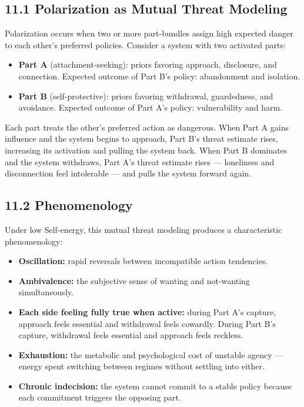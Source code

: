 \documentclass[11pt]{article}
\providecommand{\tightlist}{%
  \setlength{\itemsep}{0pt}\setlength{\parskip}{0pt}}
\begin{document}
\subsection{11.1 Polarization as Mutual Threat
Modeling}\label{polarization-as-mutual-threat-modeling}

Polarization occurs when two or more part-bundles assign high expected
danger to each other's preferred policies. Consider a system with two
activated parts:

\begin{itemize}
\tightlist
\item
  \textbf{Part A} (attachment-seeking): priors favoring approach,
  disclosure, and connection. Expected outcome of Part B's policy:
  abandonment and isolation.
\item
  \textbf{Part B} (self-protective): priors favoring withdrawal,
  guardedness, and avoidance. Expected outcome of Part A's policy:
  vulnerability and harm.
\end{itemize}

Each part treats the other's preferred action as dangerous. When Part A
gains influence and the system begins to approach, Part B's threat
estimate rises, increasing its activation and pulling the system back.
When Part B dominates and the system withdraws, Part A's threat estimate
rises --- loneliness and disconnection feel intolerable --- and pulls
the system forward again.

\subsection{11.2 Phenomenology}\label{phenomenology}

Under low Self-energy, this mutual threat modeling produces a
characteristic phenomenology:

\begin{itemize}
\tightlist
\item
  \textbf{Oscillation:} rapid reversals between incompatible action
  tendencies.
\item
  \textbf{Ambivalence:} the subjective sense of wanting and not-wanting
  simultaneously.
\item
  \textbf{Each side feeling fully true when active:} during Part A's
  capture, approach feels essential and withdrawal feels cowardly.
  During Part B's capture, withdrawal feels essential and approach feels
  reckless.
\item
  \textbf{Exhaustion:} the metabolic and psychological cost of unstable
  agency --- energy spent switching between regimes without settling
  into either.
\item
  \textbf{Chronic indecision:} the system cannot commit to a stable
  policy because each commitment triggers the opposing part.
\end{itemize}
\end{document}
